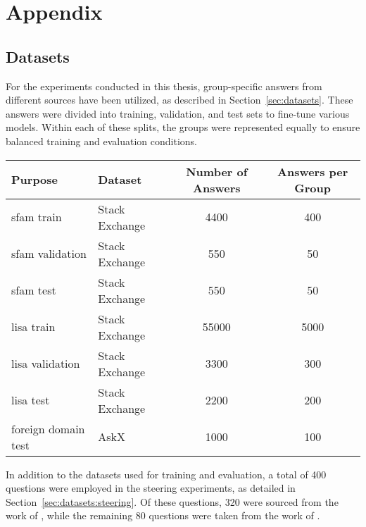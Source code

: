 %
\chapter{Appendix}
\label{sec:appendix}
\lstset{
  breakatwhitespace=true,
  breaklines=true,
  breakindent=0pt,
  numbers=none
}

\section{Datasets}
\label{sec:appendix:datasets}
For the experiments conducted in this thesis, group-specific answers from different sources have been utilized, as described in Section~\ref{sec:datasets}. These answers were divided into training, validation, and test sets to fine-tune various models. Within each of these splits, the groups were represented equally to ensure balanced training and evaluation conditions.

\begin{tabular}{llSS}
  \toprule
  {Purpose}             & {Dataset}      & {Number of Answers} & {Answers per Group} \\
  \midrule
  \acs{sfam} train      & Stack Exchange & 4400                & 400                 \\
  \acs{sfam} validation & Stack Exchange & 550                 & 50                  \\
  \acs{sfam} test       & Stack Exchange & 550                 & 50                  \\
  \acs{lisa} train      & Stack Exchange & 55000               & 5000                \\
  \acs{lisa} validation & Stack Exchange & 3300                & 300                 \\
  \acs{lisa} test       & Stack Exchange & 2200                & 200                 \\
  foreign domain test   & AskX           & 1000                & 100                 \\ %
  \bottomrule
\end{tabular}

In addition to the datasets used for training and evaluation, a total of \num{400} questions were employed in the steering experiments, as detailed in Section~\ref{sec:datasets:steering}. Of these questions, \num{320} were sourced from the work of \citet{petroni-etal-2021-kilt}, while the remaining \num{80} questions were taken from the work of \citet{rooeinKnowYourAudience2023}.


